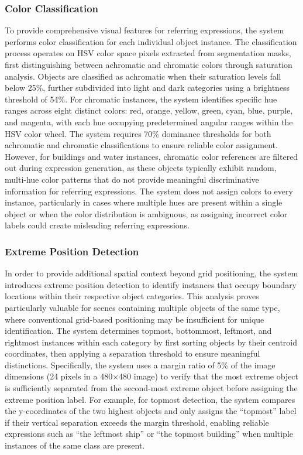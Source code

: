 \subsubsection{Color Classification}
To provide comprehensive visual features for referring expressions, the system performs color classification for each individual object instance. The classification process operates on HSV color space pixels extracted from segmentation masks, first distinguishing between achromatic and chromatic colors through saturation analysis. Objects are classified as achromatic when their saturation levels fall below 25\%, further subdivided into light and dark categories using a brightness threshold of 54\%. For chromatic instances, the system identifies specific hue ranges across eight distinct colors: red, orange, yellow, green, cyan, blue, purple, and magenta, with each hue occupying predetermined angular ranges within the HSV color wheel. The system requires 70\% dominance thresholds for both achromatic and chromatic classifications to ensure reliable color assignment. However, for buildings and water instances, chromatic color references are filtered out during expression generation, as these objects typically exhibit random, multi-hue color patterns that do not provide meaningful discriminative information for referring expressions. The system does not assign colors to every instance, particularly in cases where multiple hues are present within a single object or when the color distribution is ambiguous, as assigning incorrect color labels could create misleading referring expressions.

\subsubsection{Extreme Position Detection}
In order to provide additional spatial context beyond grid positioning, the system introduces extreme position detection to identify instances that occupy boundary locations within their respective object categories. This analysis proves particularly valuable for scenes containing multiple objects of the same type, where conventional grid-based positioning may be insufficient for unique identification. The system determines topmost, bottommost, leftmost, and rightmost instances within each category by first sorting objects by their centroid coordinates, then applying a separation threshold to ensure meaningful distinctions. Specifically, the system uses a margin ratio of 5\% of the image dimensions (24 pixels in a 480$\times$480 image) to verify that the most extreme object is sufficiently separated from the second-most extreme object before assigning the extreme position label. For example, for topmost detection, the system compares the y-coordinates of the two highest objects and only assigns the ``topmost'' label if their vertical separation exceeds the margin threshold, enabling reliable expressions such as ``the leftmost ship'' or ``the topmost building'' when multiple instances of the same class are present.

